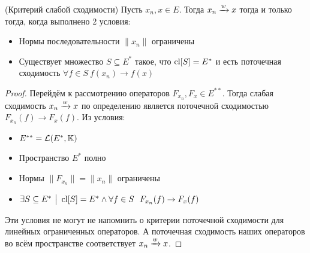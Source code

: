 \begin{theorem} (Критерий слабой сходимости)
	Пусть $x_n, x \in E$. Тогда $x_n \xrightarrow{w} x$ тогда и только тогда, когда выполнено 2 условия:
	\begin{itemize}
		\item Нормы последовательности $\|x_n\|$ ограничены
		
		\item Существует множество $S \subseteq E^*$ такое, что $\operatorname{cl} [S] = E^*$ и есть поточечная сходимость $\forall f \in S\ f(x_n) \to f(x)$
	\end{itemize}
\end{theorem}

\begin{proof}
	Перейдём к рассмотрению операторов $F_{x_n}, F_x \in E^{**}$. Тогда слабая сходимость $x_n \xrightarrow{w} x$ по определению является поточечной сходимостью $F_{x_n}(f) \to F_x(f)$. Из условия:
	\begin{itemize}
		\item $E^{**} = \mathcal{L}(E^*, \mathbb{K})$
		
		\item Пространство $E^*$ полно
		
		\item Нормы $\|F_{x_n}\| = \|x_n\|$ ограничены
		
		\item $\exists S \subseteq E^* \ \big|\  \operatorname{cl} [S] = E^* \wedge \forall f \in S\ \ F_{x_n}(f) \to F_x(f)$
	\end{itemize}
	Эти условия не могут не напомнить о критерии поточечной сходимости для линейных ограниченных операторов. А поточечная сходимость наших операторов во всём пространстве соответствует $x_n \xrightarrow{w} x$.
\end{proof}

